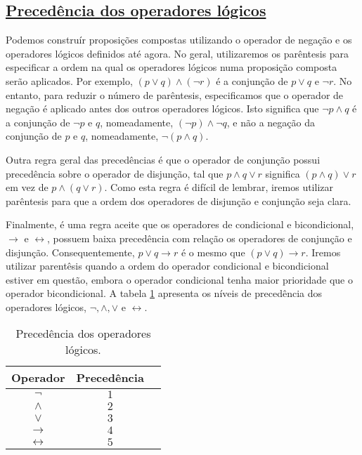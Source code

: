 \subsection*{\underline{Precedência dos operadores lógicos}}

Podemos construír proposições compostas utilizando o operador de negação e os
operadores lógicos definidos até agora. No geral, utilizaremos os parêntesis
para especificar a ordem na qual os operadores lógicos numa proposição composta
serão aplicados. Por exemplo, $(p \lor q) \land (\lnot r)$ é a conjunção de $p
\lor q$ e $\lnot r$. No entanto, para reduzir o número de parêntesis,
especificamos que o operador de negação é aplicado antes dos outros operadores
lógicos. Isto significa que $\lnot p \land q$ é a conjunção de $\lnot p$ e $q$,
nomeadamente, $(\lnot p) \land \lnot q$, e não a negação da conjunção de $p$ e
$q$, nomeadamente, $\lnot (p \land q)$.

Outra regra geral das precedências é que o operador de conjunção possui
precedência sobre o operador de disjunção, tal que $p \land q \lor r$ significa
$(p \land q) \lor r$ em vez de $p \land (q \lor r)$. Como esta regra é difícil
de lembrar, iremos utilizar parêntesis para que a ordem dos operadores
de disjunção e conjunção seja clara.

Finalmente, é uma regra aceite que os operadores de condicional e
bicondicional, $\to$ e $\leftrightarrow$, possuem baixa precedência com relação
os operadores de conjunção e disjunção. Consequentemente, $p \lor q \to r$ é o
mesmo que $(p \lor q) \to r$. Iremos utilizar parentêsis quando a ordem do
operador condicional e bicondicional estiver em questão, embora o operador
condicional tenha maior prioridade que o operador bicondicional. A tabela
\ref{tabela:18} apresenta os níveis de precedência dos operadores lógicos,
$\lnot, \land, \lor$ e $\leftrightarrow$.

	
\begin{table}[H]
	\centering
	\begin{tabular}{|c|c|c|}%
	\toprule
	\textbf{Operador} & \textbf{Precedência}\\
	\midrule
	$\lnot$ & $1$ \\
	$\land$ & $2$ \\
	$\lor$ & $3$ \\
	$\to$ & $4$ \\
	$\leftrightarrow$ & $5$ \\
	\bottomrule%
	\end{tabular}%
	\caption{Precedência dos operadores lógicos.}
	\label{tabela:18}
\end{table}



